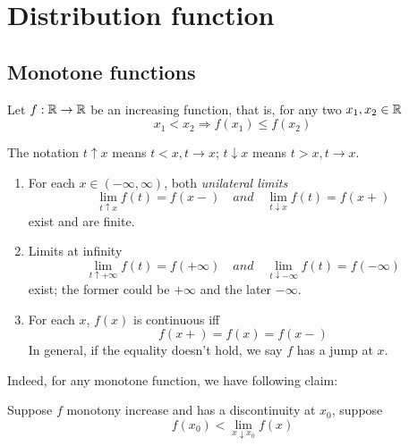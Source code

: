 \chapter{Distribution function}
\section{Monotone functions}

Let $f: {\mathbb{R}} \to {\mathbb{R}}$ be an increasing function, that is, for any two $x_1, x_2\in {\mathbb{R}}$
\[
x_1<x_2 \Rightarrow f(x_1)\leq f(x_2)
\]

The notation $t\uparrow x$ means $t<x, t\to x$; $t\downarrow x$ means $t > x, t \to x$. 

\begin{enumerate}
	\item For each $x\in(-\infty, \infty)$, both \textit{unilateral limits}
		\[
			\lim\limits_{t\uparrow x} f(t) = f(x-)\quad and \quad \lim\limits_{t\downarrow x} f(t) = f(x+)
		\]
		exist and are finite.
	\item Limits at infinity
		\[
			\lim\limits_{t\uparrow +\infty} f(t) = f(+\infty)\quad and \quad \lim\limits_{t\downarrow -\infty} f(t) = f(-\infty)
		\]
		exist; the former could be $+\infty$ and the later $-\infty$.
	\item For each $x$, $f(x)$ is continuous iff
		\[
			f(x+) = f(x) = f(x-)
		\]
		In general, if the equality doesn't hold, we say $f$ has a jump at $x$.
\end{enumerate}
Indeed, for any monotone function, we have following claim:
\begin{claim}
	Suppose $f$ monotony increase and has a discontinuity at $x_0$, suppose 
	\[
		f(x_0) < \lim\limits_{x\downarrow x_0} f(x)
	\]
\end{claim}